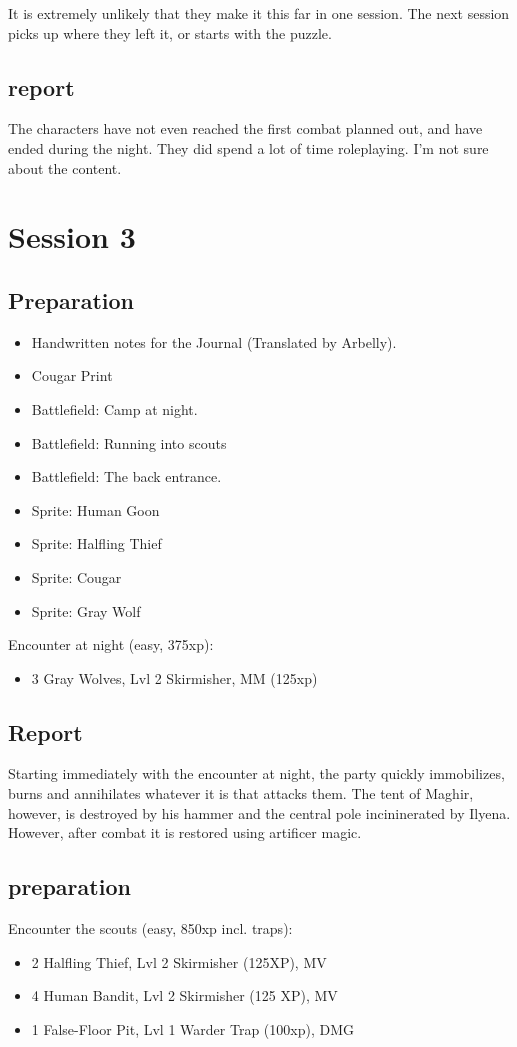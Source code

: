 It is extremely unlikely that they make it this far in one session. The next session picks up where they left it, or starts with the puzzle.

\section{report}
The characters have not even reached the first combat planned out, and have ended during the night. They did spend a lot of time roleplaying. I'm not sure about the content.

\chapter{Session 3}
\section{Preparation}
\begin{itemize}
\item Handwritten notes for the Journal (Translated by Arbelly).
\item Cougar Print
\item Battlefield: Camp at night.
\item Battlefield: Running into scouts
\item Battlefield: The back entrance.
\item Sprite: Human Goon
\item Sprite: Halfling Thief
\item Sprite: Cougar
\item Sprite: Gray Wolf
\end{itemize}

Encounter at night (easy, 375xp):
\begin{itemize}
\item 3 Gray Wolves, Lvl 2 Skirmisher, MM (125xp)
\end{itemize}

\section{Report}
Starting immediately with the encounter at night, the party quickly immobilizes, burns and annihilates whatever it is that attacks them. The tent of Maghir, however, is destroyed by his hammer and the central pole incininerated by Ilyena. However, after combat it is restored using artificer magic.

\section{preparation}
Encounter the scouts (easy, 850xp incl. traps):
\begin{itemize}
\item 2 Halfling Thief, Lvl 2 Skirmisher (125XP), MV
\item 4 Human Bandit, Lvl 2 Skirmisher (125 XP), MV
\item 1 False-Floor Pit, Lvl 1 Warder Trap (100xp), DMG
\end{itemize}
